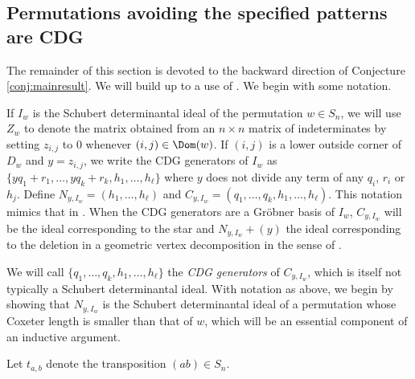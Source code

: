 \subsection{Permutations avoiding the specified patterns are CDG} \label{subsect:backward} The remainder of this section is devoted to the backward direction of Conjecture \ref{conj:mainresult}.  We will build up to a use of \cite[Corollary 4.13]{KR}.  We begin with some notation.

If $I_w$ is the Schubert determinantal ideal of the permutation $w \in S_n$, we will use $Z_w$ to denote the matrix obtained from an $n \times n$ matrix of indeterminates by setting $z_{i,j}$ to $0$ whenever $(i,j) \in \Dom(w)$.   If $(i,j)$ is a lower outside corner of $D_w$ and $y = z_{i,j}$, we write the CDG generators of $I_w$ as $\{yq_1+r_1, \ldots, yq_k+r_k, h_1, \ldots, h_\ell\}$ where $y$ does not divide any term of any $q_i$, $r_i$ or $h_j$.  Define $N_{y,I_w} = (h_1, \ldots, h_\ell)$ and $C_{y,I_w} = (q_1, \ldots, q_k, h_1, \ldots, h_\ell)$.  This notation mimics that in \cite{KR}.  When the CDG generators are a Gr\"obner basis of $I_w$, $C_{y,I_w}$ will be the ideal corresponding to the star and $N_{y,I_w}+(y)$ the ideal corresponding to the deletion in a geometric vertex decomposition in the sense of \cite{KMY09}.

We will call $\{q_1, \ldots, q_k, h_1, \ldots, h_\ell\}$ the \emph{CDG generators} of $C_{y,I_w}$, which is itself not typically a Schubert determinantal ideal.  With notation as above, we begin by showing that $N_{y,I_w}$ is the Schubert determinantal ideal of a permutation whose Coxeter length is smaller than that of $w$, which will be an essential component of an inductive argument.

Let $t_{a,b}$ denote the transposition $(ab) \in S_n$.

